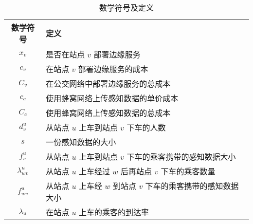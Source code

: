 \begin{table}[!t]
  \caption{数学符号及定义}
  \label{table_notations_monet}
  \centering
  \begin{tabular}{|c|p{10.5cm}|}
    \hline
    \textbf{数学符号} & \textbf{定义}\\
    \hline
    $x_v$ & 是否在站点 $v$ 部署边缘服务\\\hline
    $c_v$ & 在站点 $v$ 部署边缘服务的成本\\\hline
    $C_v$ & 在公交网络中部署边缘服务的总成本\\\hline
    $c_c$ &  使用蜂窝网络上传感知数据的单价成本\\\hline
    $C_c$ &  使用蜂窝网络上传感知数据的总成本\\\hline
    $d_v^u$ & 从站点 $u$ 上车到站点 $v$ 下车的人数\\\hline
    $s$ & 一份感知数据的大小\\\hline
    $f_v^u$ & 从站点 $u$ 上车到站点 $v$ 下车的乘客携带的感知数据大小\\\hline
    $\lambda^u_{wv}$ & 从站点 $u$ 上车经过 $w$ 后再站点 $v$ 下车的乘客数量\\\hline
    $f_{wv}^u$ & 从站点 $u$ 上车经 $w$ 到站点 $v$ 下车的乘客携带的感知数据大小\\\hline
    ${\lambda}_{u}$ & 在站点 $u$ 上车的乘客的到达率\\\hline

\end{tabular}
\end{table}
